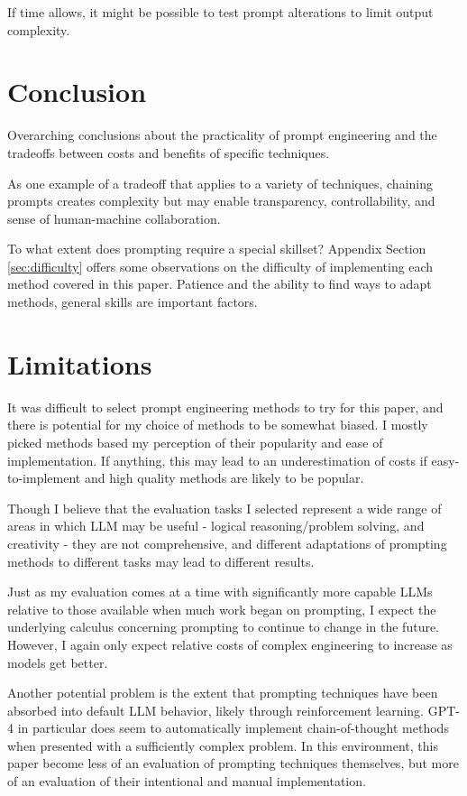 \documentclass[11pt]{article}
\begin{document}
If time allows, it might be possible to test prompt alterations to limit output complexity. \cite{pu_chatgpt_2023, imperial_flesch_2023}

\section*{Conclusion}

Overarching conclusions about the practicality of prompt engineering and the tradeoffs between costs and benefits of specific techniques.

As one example of a tradeoff that applies to a variety of techniques, chaining prompts creates complexity but may enable transparency, controllability, and sense of human-machine collaboration. \cite{wu_ai_2022}

To what extent does prompting require a special skillset? Appendix Section \ref{sec:difficulty} offers some observations on the difficulty of implementing each method covered in this paper. Patience and the ability to find ways to adapt methods, general skills are important factors.

\section*{Limitations}

It was difficult to select prompt engineering methods to try for this paper, and there is potential for my choice of methods to be somewhat biased. I mostly picked methods based my perception of their popularity and ease of implementation. If anything, this may lead to an underestimation of costs if easy-to-implement and high quality methods are likely to be popular. 

Though I believe that the evaluation tasks I selected represent a wide range of areas in which LLM may be useful - logical reasoning/problem solving, and creativity - they are not comprehensive, and different adaptations of prompting methods to different tasks may lead to different results.

Just as my evaluation comes at a time with significantly more capable LLMs relative to those available when much work began on prompting, I expect the underlying calculus concerning prompting to continue to change in the future. However, I again only expect relative costs of complex engineering to increase as models get better.

Another potential problem is the extent that prompting techniques have been absorbed into default LLM behavior, likely through reinforcement learning. GPT-4 in particular does seem to automatically implement chain-of-thought methods when presented with a sufficiently complex problem. In this environment, this paper become less of an evaluation of prompting techniques themselves, but more of an evaluation of their intentional and manual implementation.
\end{document}
